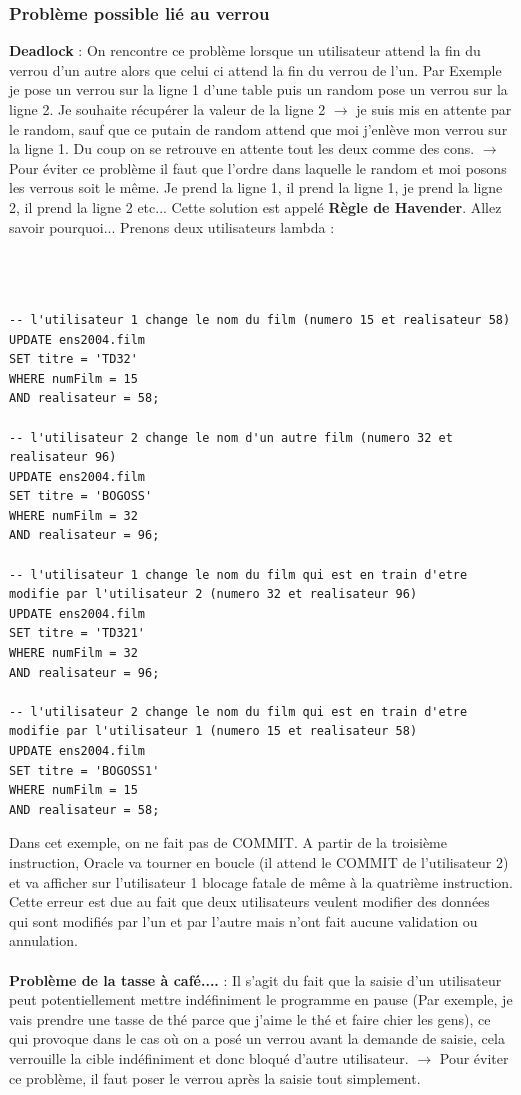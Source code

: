 \documentclass{report}
\begin{document}
\subsubsection{Problème possible lié au verrou}
\textbf{Deadlock} : On rencontre ce problème lorsque un utilisateur attend la fin du verrou d'un autre alors que celui ci attend la fin du verrou de l'un. 
\newline Par Exemple je pose un verrou sur la ligne 1 d'une table puis un random pose un verrou sur la ligne 2. Je souhaite récupérer la valeur de la ligne 2 $\rightarrow$ je suis mis en attente par le random, sauf que ce putain de random attend que moi j'enlève mon verrou sur la ligne 1. Du coup on se retrouve en attente tout les deux comme des cons.
$\rightarrow$ Pour éviter ce problème il faut que l'ordre dans laquelle le random et moi posons les verrous soit le même. Je prend la ligne 1, il prend la ligne 1, je prend la ligne 2, il prend la ligne 2 etc... Cette solution est appelé \textbf{Règle de Havender}. Allez savoir pourquoi...
\newline
Prenons deux utilisateurs lambda :\\\\\\\
\begin{lstlisting}[style=MySQLStyle]
-- l'utilisateur 1 change le nom du film (numero 15 et realisateur 58)
UPDATE ens2004.film
SET titre = 'TD32'
WHERE numFilm = 15
AND realisateur = 58;

-- l'utilisateur 2 change le nom d'un autre film (numero 32 et realisateur 96)
UPDATE ens2004.film
SET titre = 'BOGOSS'
WHERE numFilm = 32
AND realisateur = 96;

-- l'utilisateur 1 change le nom du film qui est en train d'etre modifie par l'utilisateur 2 (numero 32 et realisateur 96)
UPDATE ens2004.film
SET titre = 'TD321'
WHERE numFilm = 32
AND realisateur = 96;

-- l'utilisateur 2 change le nom du film qui est en train d'etre modifie par l'utilisateur 1 (numero 15 et realisateur 58)
UPDATE ens2004.film
SET titre = 'BOGOSS1'
WHERE numFilm = 15
AND realisateur = 58;
\end{lstlisting}

Dans cet exemple, on ne fait pas de COMMIT. A partir de la troisième instruction, Oracle va tourner en boucle (il attend le COMMIT de l'utilisateur 2) et va afficher sur l'utilisateur 1 blocage fatale de même à la quatrième instruction.
Cette erreur est due au fait que deux utilisateurs veulent modifier des données qui sont modifiés par l'un et par l'autre mais n'ont fait aucune validation ou annulation.\\\\
\textbf{Problème de la tasse à café....} : Il s'agit du fait que la saisie d'un utilisateur peut potentiellement mettre indéfiniment le programme en pause (Par exemple, je vais prendre une tasse de thé parce que j'aime le thé et faire chier les gens), ce qui provoque dans le cas où on a posé un verrou avant la demande de saisie, cela verrouille la cible indéfiniment et donc bloqué d'autre utilisateur.
$\rightarrow$ Pour éviter ce problème, il faut poser le verrou après la saisie tout simplement. 
\end{document}
